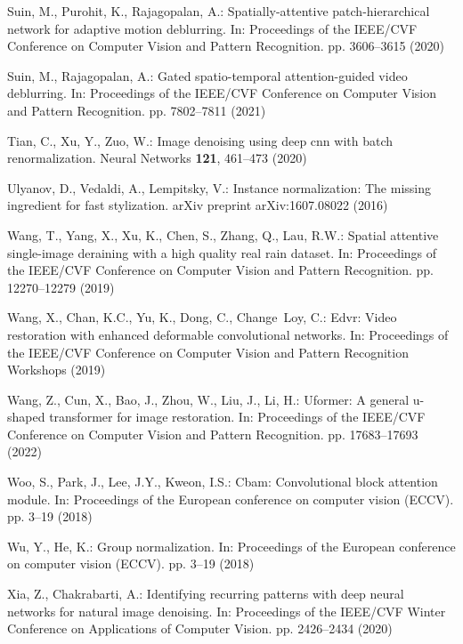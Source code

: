 \documentclass[runningheads]{llncs}
\begin{document}
\begin{thebibliography}{10}
Suin, M., Purohit, K., Rajagopalan, A.: Spatially-attentive patch-hierarchical
  network for adaptive motion deblurring. In: Proceedings of the IEEE/CVF
  Conference on Computer Vision and Pattern Recognition. pp. 3606--3615 (2020)

Suin, M., Rajagopalan, A.: Gated spatio-temporal attention-guided video
  deblurring. In: Proceedings of the IEEE/CVF Conference on Computer Vision and
  Pattern Recognition. pp. 7802--7811 (2021)

Tian, C., Xu, Y., Zuo, W.: Image denoising using deep cnn with batch
  renormalization. Neural Networks  \textbf{121},  461--473 (2020)

Ulyanov, D., Vedaldi, A., Lempitsky, V.: Instance normalization: The missing
  ingredient for fast stylization. arXiv preprint arXiv:1607.08022  (2016)

Wang, T., Yang, X., Xu, K., Chen, S., Zhang, Q., Lau, R.W.: Spatial attentive
  single-image deraining with a high quality real rain dataset. In: Proceedings
  of the IEEE/CVF Conference on Computer Vision and Pattern Recognition. pp.
  12270--12279 (2019)

Wang, X., Chan, K.C., Yu, K., Dong, C., Change~Loy, C.: Edvr: Video restoration
  with enhanced deformable convolutional networks. In: Proceedings of the
  IEEE/CVF Conference on Computer Vision and Pattern Recognition Workshops
  (2019)

Wang, Z., Cun, X., Bao, J., Zhou, W., Liu, J., Li, H.: Uformer: A general
  u-shaped transformer for image restoration. In: Proceedings of the IEEE/CVF
  Conference on Computer Vision and Pattern Recognition. pp. 17683--17693
  (2022)

Woo, S., Park, J., Lee, J.Y., Kweon, I.S.: Cbam: Convolutional block attention
  module. In: Proceedings of the European conference on computer vision (ECCV).
  pp. 3--19 (2018)

Wu, Y., He, K.: Group normalization. In: Proceedings of the European conference
  on computer vision (ECCV). pp. 3--19 (2018)

Xia, Z., Chakrabarti, A.: Identifying recurring patterns with deep neural
  networks for natural image denoising. In: Proceedings of the IEEE/CVF Winter
  Conference on Applications of Computer Vision. pp. 2426--2434 (2020)


\end{thebibliography}
\end{document}
